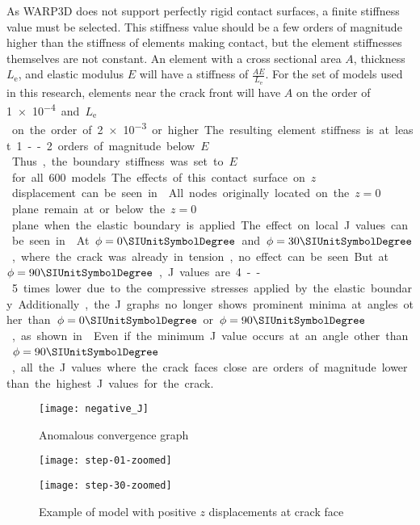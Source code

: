 As WARP3D does not support perfectly rigid contact surfaces, a finite stiffness value must be selected.
This stiffness value should be a few orders of magnitude higher than the stiffness of elements making contact, but the element stiffnesses themselves are not constant.
An element with a cross sectional area \(A\), thickness \(L_\text{e}\), and elastic modulus \(E\) will have a stiffness of \(\frac{AE}{L_\text{e}}\).
For the set of models used in this research, elements near the crack front will have \(A\) on the order of \SI{1e-4} and \(L_\text{e}\) on the order of \SI{2e-3} or higher.
The resulting element stiffness is at least 1--2 orders of magnitude below \(E\).
Thus, the boundary stiffness was set to \(E\) for all 600 models.
The effects of this contact surface on \(z\) displacement can be seen in .
All nodes originally located on the \(z=0\) plane remain at or below the \(z=0\) plane when the elastic boundary is applied.

The effect on local \J values can be seen in .
At \(\phi=0{\SIUnitSymbolDegree}\) and \(\phi=30{\SIUnitSymbolDegree}\), where the crack was already in tension, no effect can be seen.
But at \(\phi=90{\SIUnitSymbolDegree}\), \J values are 4--5 times lower due to the compressive stresses applied by the elastic boundary.
Additionally, the \J graphs no longer shows prominent minima at angles other than \(\phi=0{\SIUnitSymbolDegree}\) or \(\phi=90{\SIUnitSymbolDegree}\), as shown in .
Even if the minimum \J value occurs at an angle other than \(\phi=90{\SIUnitSymbolDegree}\), all the \J values where the crack faces close are orders of magnitude lower than the highest \J values for the crack.

\begin{figure}[tbp]
\centering
\texttt{[image: negative\_J]}
\caption{\label{fig:negative_J} Anomalous \J convergence graph}
\end{figure}

\begin{figure}[tbp]
\centering
\begin{minipage}{0.45\columnwidth}
\texttt{[image: step-01-zoomed]}
\end{minipage}
\begin{minipage}{0.45\columnwidth}
\texttt{[image: step-30-zoomed]}
\end{minipage}
\caption{\label{fig:positive-displacements} Example of model with positive \(z\) displacements at crack face}
\end{figure}

